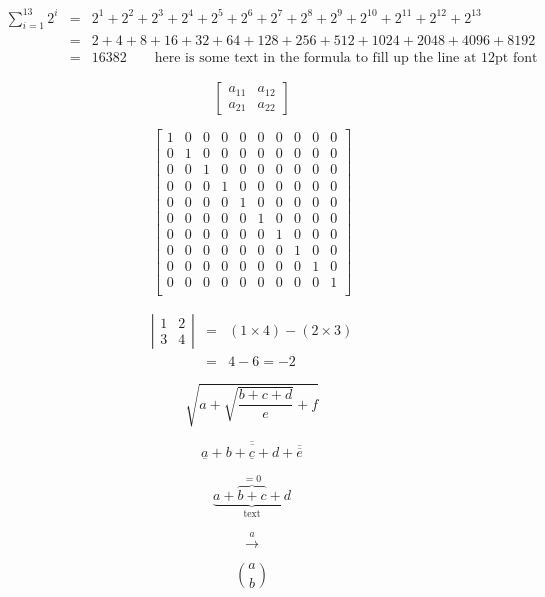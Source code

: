 \begin{eqnarray*}
\sum_{i=1}^{13} 2^i &=& 2^1 + 2^2 + 2^3 + 2^4 + 2^5 + 2^6 + 2^7 + 2^8 + 2^9 + 2^{10} + 2^{11} + 2^{12} + 2^{13}\\
&=&2 + 4 + 8 + 16 + 32 + 64 + 128 + 256 + 512 + 1024 + 2048 + 4096 + 8192\\
&=&16382 \qquad\mbox{here is some text in the formula to fill up the line at 12pt font}
\end{eqnarray*}

\[
\left[\begin{array}{cc} a_{11} & a_{12}\\ a_{21} & a_{22}\end{array}\right]
\]

\[
\left[\begin{array}{*{10}{c}} 
1 & 0 & 0 & 0 & 0 & 0 & 0 & 0 & 0 & 0 \\
0 & 1 & 0 & 0 & 0 & 0 & 0 & 0 & 0 & 0 \\
0 & 0 & 1 & 0 & 0 & 0 & 0 & 0 & 0 & 0 \\
0 & 0 & 0 & 1 & 0 & 0 & 0 & 0 & 0 & 0 \\ 
0 & 0 & 0 & 0 & 1 & 0 & 0 & 0 & 0 & 0 \\ 
0 & 0 & 0 & 0 & 0 & 1 & 0 & 0 & 0 & 0 \\ 
0 & 0 & 0 & 0 & 0 & 0 & 1 & 0 & 0 & 0 \\ 
0 & 0 & 0 & 0 & 0 & 0 & 0 & 1 & 0 & 0 \\ 
0 & 0 & 0 & 0 & 0 & 0 & 0 & 0 & 1 & 0 \\ 
0 & 0 & 0 & 0 & 0 & 0 & 0 & 0 & 0 & 1 \\ 
\end{array}\right]
\]

\begin{eqnarray*}
\left|\begin{array}{cc} 1 & 2\\ 3 & 4\end{array}\right| &=& (1\times 4) - (2 \times 3)\\
&=& 4-6 = -2
\end{eqnarray*}

\[
\sqrt{a + \sqrt{\frac{b + c + d}{e}} + f}
\]

\[
\overline{\underline{a} + \overline{b + \underline{c} + d} + \overline{\overline{e}}}
\]

\[
\underbrace{a + \overbrace{b + c}^{=0} + d}_{\mbox{text}}
\]

\[
\stackrel{a}{\longrightarrow}
\]

\[
\binom{a }{ b}
\]

